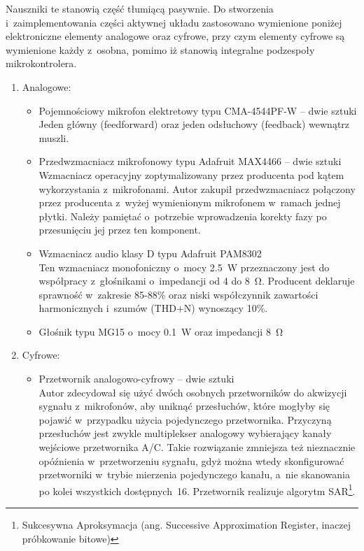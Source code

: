 Nauszniki te stanowią część tłumiącą pasywnie. Do stworzenia i~zaimplementowania części aktywnej układu zastosowano wymienione poniżej elektroniczne elementy analogowe oraz cyfrowe, przy czym elementy cyfrowe są wymienione każdy z~osobna, pomimo iż stanowią integralne podzespoły mikrokontrolera.
\begin{enumerate}
	\item Analogowe:
	\begin{itemize}
		\item Pojemnościowy mikrofon elektretowy typu CMA-4544PF-W -- dwie sztuki\\
		Jeden główny (feedforward) oraz jeden odsłuchowy (feedback) wewnątrz muszli.
		\item Przedwzmacniacz mikrofonowy typu Adafruit MAX4466 -- dwie sztuki\\
		Wzmacniacz operacyjny zoptymalizowany przez producenta pod kątem wykorzystania z~mikrofonami. Autor zakupił przedwzmacniacz połączony przez producenta z~wyżej wymienionym mikrofonem w~ramach jednej płytki. Należy pamiętać o~potrzebie wprowadzenia korekty fazy po przesunięciu jej przez ten komponent.
		\item Wzmacniacz audio klasy D typu Adafruit PAM8302\\
		Ten wzmacniacz monofoniczny o~mocy \SI{2.5}{\W} przeznaczony jest do współpracy z~głośnikami o~impedancji od \SI{4}{} do \SI{8}{\ohm}. Producent deklaruje sprawność w~zakresie 85-88\% \cite{speakeropamp} oraz niski współczynnik zawartości harmonicznych i~szumów (THD+N) wynoszący 10\%.
		\item Głośnik typu MG15 o~mocy \SI{0.1}{\W} oraz impedancji \SI{8}{\ohm}
	\end{itemize}
	\item Cyfrowe:
	\begin{itemize}
		\item Przetwornik analogowo-cyfrowy -- dwie sztuki\\
		Autor zdecydował się użyć dwóch osobnych przetworników do akwizycji sygnału z~mikrofonów, aby uniknąć przesłuchów, które mogłyby się pojawić w~przypadku użycia pojedynczego przetwornika. Przyczyną przesłuchów jest zwykle multiplekser analogowy wybierający kanały wejściowe przetwornika A/C. Takie rozwiązanie zmniejsza też nieznacznie opóźnienia w~przetworzeniu sygnału, gdyż można wtedy skonfigurować przetworniki w~trybie mierzenia pojedynczego kanału, a~nie skanowania po kolei wszystkich dostępnych~16. Przetwornik realizuje algorytm SAR\footnote{Sukcesywna Aproksymacja (ang. Successive Approximation Register, inaczej próbkowanie bitowe)}.\\

\end{itemize}
\end{enumerate}
